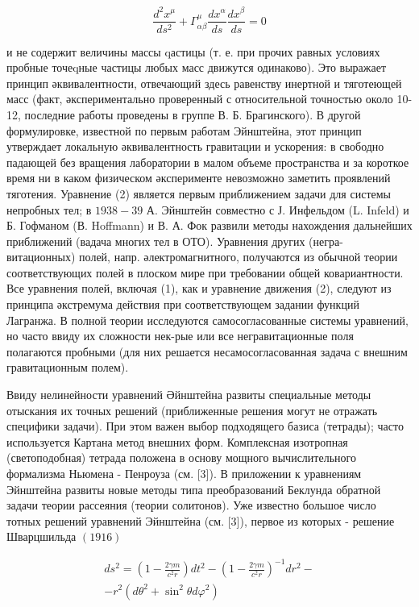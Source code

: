 \documentclass[10pt]{article}
\begin{document}
\[

\frac{d^{2} x^{\mu}}{d s^{2}}+\Gamma_{\alpha \beta}^{\mu} \frac{d x^{\alpha}}{d s} \frac{d x^{\beta}}{d s}=0

\]



и не содержит величины массы qастицы (т. е. при прочих равных условиях пробные точеqные частицы любых масс движутся одинаково). Это выражает принцип әквивалентности, отвечающий здесь равенству инертной и тяготеющей масс (факт, әкспериментально проверенный с относительной точностью около 10-12, последние работы проведены в группе В. Б. Брагинского). В другой формулировке, известной по первым работам Эйнштейна, этот принцип утверждает локальную әквивалентность гравитации и ускорения: в свободно падающей без вращения лаборатории в малом объеме пространства и за короткое время ни в каком физическом әксперименте невозможно заметить проявлений тяготения. Уравнение (2) является первым приближением задачи для системы непробных тел; в $1938-39$ А. Эйнштейн совместно с Ј. Инфельдом (L. Infeld) и Б. Гофманом (В. Hoffmann) и В. А. Фок развили методы нахождения дальнейших приближений (вадача многих тел в ОТО). Уравнения других (негра- витационных) полей, напр. әлектромагнитного, получаются из обычной теории соответствующих полей в плоском мире при требовании общей ковариантности. Все уравнения полей, включая (1), как и уравнение движения (2), следуют из принципа әкстремума действия при соответствующем задании функций Лагранжа. В полной теории исследуются самосогласованные системы уравнений, но часто ввиду их сложности нек-рые или все негравитационные поля полагаются пробными (для них решается несамосогласованная задача с внешним гравитационным полем).



Ввиду нелинейности уравнений Әйнштейна развиты специальные методы отыскания их точных решений (приближенные решения могут не отражать специфики задачи). При этом важен выбор подходящего базиса (тетрады); часто используется Картана метод внешних форм. Комплексная изотропная (светоподобная) тетрада положена в основу мощного вычислительного формализма Ньюмена - Пенроуза (см. [3]). В приложении к уравнениям Эйнштейна развиты новые методы типа преобразований Беклунда обратной задачи теории рассеяния (теории солитонов). Уже известно большое число тотных решений уравнений Эйнштейна (см. [3]), первое из которых - решение Шварцшильда $(1916)$



\[

\begin{gathered}

d s^{2}=\left(1-\frac{2 \gamma m}{c^{2} r}\right) d t^{2}-\left(1-\frac{2 \gamma m}{c^{2} r}\right)^{-1} d r^{2}- \\

-r^{2}\left(d \theta^{2}+\sin ^{2} \theta d \varphi^{2}\right)

\end{gathered}

\]
\end{document}
